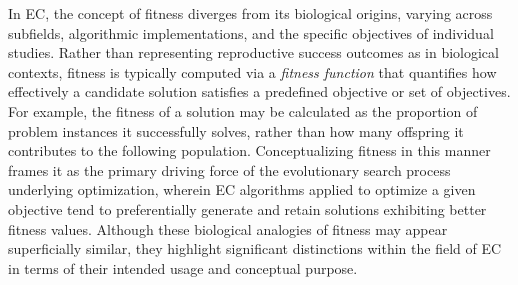 In EC, the concept of fitness diverges from its biological origins, varying across subfields, algorithmic implementations, and the specific objectives of individual studies.
Rather than representing reproductive success outcomes as in biological contexts, fitness is typically computed via a \textit{fitness function} that quantifies how effectively a candidate solution satisfies a predefined objective or set of objectives.
For example, the fitness of a solution may be calculated as the proportion of problem instances it successfully solves, rather than how many offspring it contributes to the following population.
Conceptualizing fitness in this manner frames it as the primary driving force of the evolutionary search process underlying optimization, wherein EC algorithms applied to optimize a given objective tend to preferentially generate and retain solutions exhibiting better fitness values.
Although these biological analogies of fitness may appear superficially similar, they highlight significant distinctions within the field of EC in terms of their intended usage and conceptual purpose.


